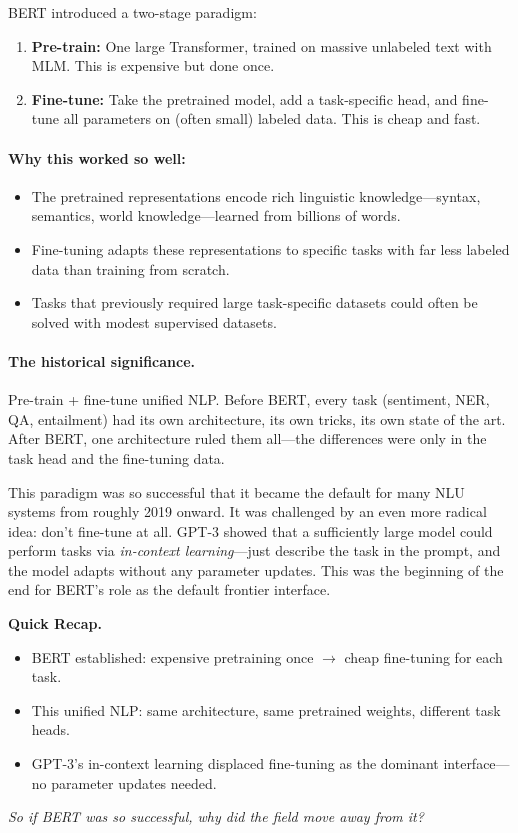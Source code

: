 BERT introduced a two-stage paradigm:
\begin{enumerate}[nosep]
  \item \textbf{Pre-train:} One large Transformer, trained on massive unlabeled text with MLM. This is expensive but done once.
  \item \textbf{Fine-tune:} Take the pretrained model, add a task-specific head, and fine-tune all parameters on (often small) labeled data. This is cheap and fast.
\end{enumerate}

\paragraph{Why this worked so well:}
\begin{itemize}[nosep]
  \item The pretrained representations encode rich linguistic knowledge---syntax, semantics, world knowledge---learned from billions of words.
  \item Fine-tuning adapts these representations to specific tasks with far less labeled data than training from scratch.
  \item Tasks that previously required large task-specific datasets could often be solved with modest supervised datasets.
\end{itemize}

\paragraph{The historical significance.} Pre-train + fine-tune unified NLP. Before BERT, every task (sentiment, NER, QA, entailment) had its own architecture, its own tricks, its own state of the art. After BERT, one architecture ruled them all---the differences were only in the task head and the fine-tuning data.

This paradigm was so successful that it became the default for many NLU systems from roughly 2019 onward. It was challenged by an even more radical idea: don't fine-tune at all. GPT-3 showed that a sufficiently large model could perform tasks via \emph{in-context learning}---just describe the task in the prompt, and the model adapts without any parameter updates. This was the beginning of the end for BERT's role as the default frontier interface.

\begin{quickrecap}
\textbf{Quick Recap.}
\begin{itemize}[nosep,leftmargin=1.5em]
  \item BERT established: expensive pretraining once $\to$ cheap fine-tuning for each task.
  \item This unified NLP: same architecture, same pretrained weights, different task heads.
  \item GPT-3's in-context learning displaced fine-tuning as the dominant interface---no parameter updates needed.
\end{itemize}
\textit{So if BERT was so successful, why did the field move away from it?}
\end{quickrecap}


